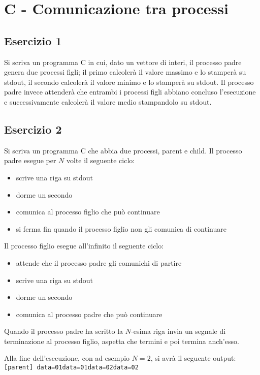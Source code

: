 \documentclass{article}
\def\code#1{\texttt{#1}}
\begin{document}
\section*{C - Comunicazione tra processi}
\subsection*{Esercizio 1}
Si scriva un programma C in cui, dato un vettore di interi, il processo padre genera due processi figli; il primo calcolerà il valore massimo e lo stamperà su stdout, il secondo calcolerà il valore minimo e lo stamperà su stdout. Il processo padre invece attenderà che entrambi i processi figli abbiano concluso l'esecuzione e successivamente calcolerà il valore medio stampandolo su stdout.

\subsection*{Esercizio 2}
Si scriva un programma C che abbia due processi, parent e child. Il processo padre esegue per $N$ volte il seguente ciclo:
\begin{itemize}
    \item scrive una riga su stdout
    \item dorme un secondo
    \item comunica al processo figlio che può continuare
    \item si ferma fin quando il processo figlio non gli comunica di continuare
\end{itemize}
Il processo figlio esegue all'infinito il seguente ciclo:
\begin{itemize}
    \item attende che il processo padre gli comunichi di partire
    \item scrive una riga su stdout
    \item dorme un secondo
    \item comunica al processo padre che può continuare
\end{itemize}
Quando il processo padre ha scritto la $N$-esima riga invia un segnale di terminazione al processo figlio, aspetta che termini e poi termina anch'esso.
 
Alla fine dell'esecuzione, con ad esempio $N = 2$, si avrà il seguente output:\newline
\code{[parent] data=01\newline[child ] data=01\newline[parent] data=02\newline[child ] data=02\newline}
\end{document}
